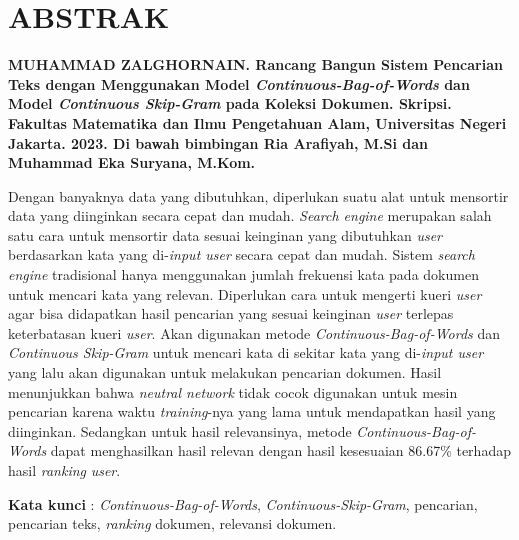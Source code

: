 \documentclass[12pt]{report}
\begin{document}
\linespread{1.1}\selectfont

\cleardoublepage
{}
\section*{ABSTRAK}
\hfill \break
{\parindent0pt
\textbf{MUHAMMAD ZALGHORNAIN. Rancang Bangun Sistem Pencarian Teks dengan Menggunakan Model \textit{Continuous-Bag-of-Words} dan Model \textit{Continuous Skip-Gram} pada Koleksi Dokumen. Skripsi. Fakultas Matematika dan Ilmu Pengetahuan Alam, Universitas Negeri Jakarta. 2023. Di bawah bimbingan Ria Arafiyah, M.Si dan Muhammad Eka Suryana, M.Kom.}
\newline

Dengan banyaknya data yang dibutuhkan, diperlukan suatu alat untuk mensortir data yang diinginkan secara cepat dan mudah. \textit{Search engine} merupakan salah satu cara untuk mensortir data sesuai keinginan yang dibutuhkan \textit{user} berdasarkan kata yang di-\textit{input user} secara cepat dan mudah. Sistem \textit{search engine} tradisional hanya menggunakan jumlah frekuensi kata pada dokumen untuk mencari kata yang relevan. Diperlukan cara untuk mengerti kueri \textit{user} agar bisa didapatkan hasil pencarian yang sesuai keinginan \textit{user} terlepas keterbatasan kueri \textit{user}. Akan digunakan metode \textit{Continuous-Bag-of-Words} dan \textit{Continuous Skip-Gram} untuk mencari kata di sekitar kata yang di-\textit{input user} yang lalu akan digunakan untuk melakukan pencarian dokumen. Hasil menunjukkan bahwa \textit{neutral network} tidak cocok digunakan untuk mesin pencarian karena waktu \textit{training}-nya yang lama untuk mendapatkan hasil yang diinginkan. Sedangkan untuk hasil relevansinya, metode \textit{Continuous-Bag-of-Words} dapat menghasilkan hasil relevan dengan hasil kesesuaian 86.67\% terhadap hasil \textit{ranking} \textit{user}.
\newline

\textbf{Kata kunci} : \textit{Continuous-Bag-of-Words}, \textit{Continuous-Skip-Gram},  pencarian, pencarian teks, \textit{ranking} dokumen, relevansi dokumen.
}


\cleardoublepage
{}
\end{document}
